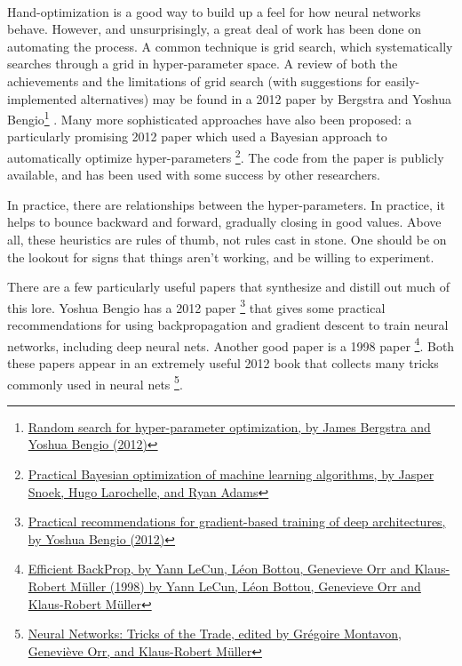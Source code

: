 \paragraph{} Hand-optimization is a good way to build up a feel for how neural networks behave. However, and unsurprisingly, a great deal of work has been done on automating the process. A common technique is grid search, which systematically searches through a grid in hyper-parameter space. A review of both the achievements and the limitations of grid search (with suggestions for easily-implemented alternatives) may be found in a 2012 paper by Bergstra and Yoshua Bengio\footnote{\href{https://dl.acm.org/doi/10.5555/2503308.2188395}{Random search for hyper-parameter optimization, by James Bergstra and Yoshua Bengio (2012)}} . Many more sophisticated approaches have also been proposed: a particularly promising 2012 paper which used a Bayesian approach to automatically optimize hyper-parameters \footnote{\href{http://papers.nips.cc/paper/4522-practical-bayesian-optimization-of-machine-learning-algorithms.pdf}{Practical Bayesian optimization of machine learning algorithms, by Jasper Snoek, Hugo Larochelle, and Ryan Adams}}. The code from the paper is publicly available, and has been used with some success by other researchers.

In practice, there are relationships between the hyper-parameters. In practice, it helps to bounce backward and forward, gradually closing in good values. Above all, these heuristics are rules of thumb, not rules cast in stone. One should be on the lookout for signs that things aren't working, and be willing to experiment. 

There are a few particularly useful papers that synthesize and distill out much of this lore. Yoshua Bengio has a 2012 paper \footnote{\href{https://arxiv.org/abs/1206.5533}{Practical recommendations for gradient-based training of deep architectures, by Yoshua Bengio (2012)}} that gives some practical recommendations for using backpropagation and gradient descent to train neural networks, including deep neural nets. Another good paper is a 1998 paper \footnote{\href{http://yann.lecun.com/exdb/publis/pdf/lecun-98b.pdf}{Efficient BackProp, by Yann LeCun, Léon Bottou, Genevieve Orr and Klaus-Robert Müller (1998) by Yann LeCun, Léon Bottou, Genevieve Orr and Klaus-Robert Müller}}. Both these papers appear in an extremely useful 2012 book that collects many tricks commonly used in neural nets \footnote{\href{https://www.springer.com/gp/book/9783642352881}{Neural Networks: Tricks of the Trade, edited by Grégoire Montavon, Geneviève Orr, and Klaus-Robert Müller}}.

